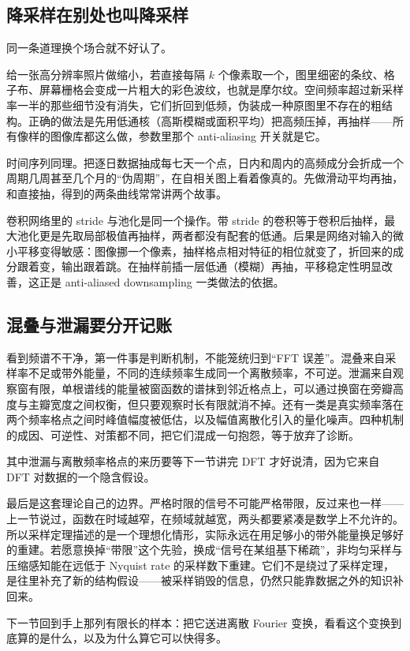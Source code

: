 \subsection{降采样在别处也叫降采样}

同一条道理换个场合就不好认了。

给一张高分辨率照片做缩小，若直接每隔 \(k\) 个像素取一个，图里细密的条纹、格子布、屏幕栅格会变成一片粗大的彩色波纹，也就是摩尔纹。空间频率超过新采样率一半的那些细节没有消失，它们折回到低频，伪装成一种原图里不存在的粗结构。正确的做法是先用低通核（高斯模糊或面积平均）把高频压掉，再抽样——所有像样的图像库都这么做，参数里那个 anti-aliasing 开关就是它。

时间序列同理。把逐日数据抽成每七天一个点，日内和周内的高频成分会折成一个周期几周甚至几个月的``伪周期''，在自相关图上看着像真的。先做滑动平均再抽，和直接抽，得到的两条曲线常常讲两个故事。

卷积网络里的 stride 与池化是同一个操作。带 stride 的卷积等于卷积后抽样，最大池化更是先取局部极值再抽样，两者都没有配套的低通。后果是网络对输入的微小平移变得敏感：图像挪一个像素，抽样格点相对特征的相位就变了，折回来的成分跟着变，输出跟着跳。在抽样前插一层低通（模糊）再抽，平移稳定性明显改善，这正是 anti-aliased downsampling 一类做法的依据。

\subsection{混叠与泄漏要分开记账}

看到频谱不干净，第一件事是判断机制，不能笼统归到``FFT 误差''。混叠来自采样率不足或带外能量，不同的连续频率生成同一个离散频率，不可逆。泄漏来自观察窗有限，单根谱线的能量被窗函数的谱抹到邻近格点上，可以通过换窗在旁瓣高度与主瓣宽度之间权衡，但只要观察时长有限就消不掉。还有一类是真实频率落在两个频率格点之间时峰值幅度被低估，以及幅值离散化引入的量化噪声。四种机制的成因、可逆性、对策都不同，把它们混成一句抱怨，等于放弃了诊断。

其中泄漏与离散频率格点的来历要等下一节讲完 DFT 才好说清，因为它来自 DFT 对数据的一个隐含假设。

最后是这套理论自己的边界。严格时限的信号不可能严格带限，反过来也一样——上一节说过，函数在时域越窄，在频域就越宽，两头都要紧凑是数学上不允许的。所以采样定理描述的是一个理想化情形，实际永远在用足够小的带外能量换足够好的重建。若愿意换掉``带限''这个先验，换成``信号在某组基下稀疏''，非均匀采样与压缩感知能在远低于 Nyquist rate 的采样数下重建。它们不是绕过了采样定理，是往里补充了新的结构假设——被采样销毁的信息，仍然只能靠数据之外的知识补回来。

下一节回到手上那列有限长的样本：把它送进离散 Fourier 变换，看看这个变换到底算的是什么，以及为什么算它可以快得多。
